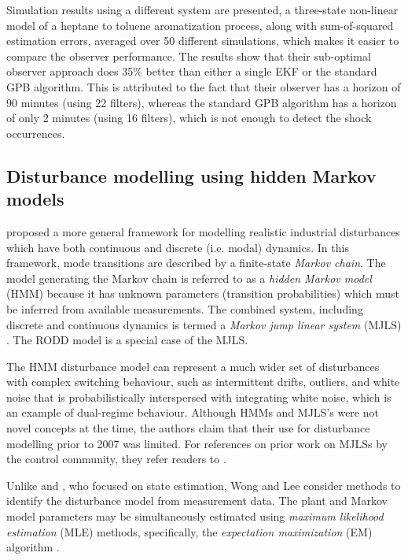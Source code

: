 Simulation results using a different system are presented, a three-state non-linear model of a heptane to toluene aromatization process, along with sum-of-squared estimation errors, averaged over 50 different simulations, which makes it easier to compare the observer performance. The results show that their sub-optimal observer approach does 35\% better than either a single EKF or the standard GPB algorithm. This is attributed to the fact that their observer has a horizon of 90 minutes (using 22 filters), whereas the standard GPB algorithm has a horizon of only 2 minutes (using 16 filters), which is not enough to detect the shock occurrences.

\subsection{Disturbance modelling using hidden Markov models}
\label{hidden_markov_models}

\cite{wong_disturbance_2007} proposed a more general framework for modelling realistic industrial disturbances which have both continuous and discrete (i.e. modal) dynamics. In this framework, mode transitions are described by a finite-state \textit{Markov chain}. The model generating the Markov chain is referred to as a \textit{hidden Markov model} (HMM) because it has unknown parameters (transition probabilities) which must be inferred from available measurements. The combined system, including discrete and continuous dynamics is termed a \textit{Markov jump linear system} (MJLS) \citep{costa_discrete-time_2005}. The RODD model is a special case of the MJLS.


The HMM disturbance model can represent a much wider set of disturbances with complex switching behaviour, such as intermittent drifts, outliers, and white noise that is probabilistically interspersed with integrating white noise, which is an example of dual-regime behaviour. Although HMMs and MJLS's were not novel concepts at the time, the authors claim that their use for disturbance modelling prior to 2007 was limited. For references on prior work on MJLSs by the control community, they refer readers to \cite{costa_discrete-time_2005}.

Unlike \cite{robertson_detection_1995} and \cite{eriksson_classification_1996}, who focused on state estimation, Wong and Lee consider methods to identify the disturbance model from measurement data. The plant and Markov model parameters may be simultaneously estimated using \textit{maximum likelihood estimation} (MLE) methods, specifically, the \textit{expectation maximization} (EM) algorithm \citep{dempster_maximum_1977}.

